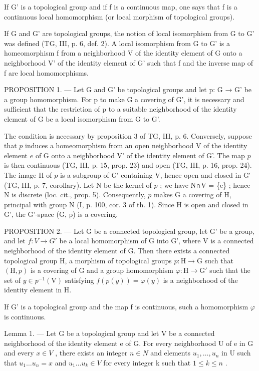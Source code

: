 If G' is a topological group and if f is a continuous map, one says that f is a continuous local homomorphism (or local morphism of topological groups).

If G and G' are topological groups, the notion of local isomorphism from G to G' was defined (TG, III, p. 6, def. 2). A local isomorphism from G to G' is a homeomorphism f from a neighborhood V of the identity element of G onto a neighborhood V' of the identity element of G' such that f and the inverse map of f are local homomorphisms.

PROPOSITION 1. --- Let G and G' be topological groups and let p: G → G' be a group homomorphism. For p to make G a covering of G', it is necessary and sufficient that the restriction of p to a suitable neighborhood of the identity element of G be a local isomorphism from G to G'.

The condition is necessary by proposition 3 of TG, III, p. 6. Conversely, suppose that \(p\) induces a homeomorphism from an open neighborhood V of the identity element \(e\) of G onto a neighborhood V' of the identity element of G'. The map \(p\) is then continuous (TG, III, p. 15, prop. 23) and open (TG, III, p. 16, prop. 24). The image H of \(p\) is a subgroup of G′ containing V, hence open and closed in G′ (TG, III, p. 7, corollary). Let N be the kernel of \(p\) ; we have N∩V = \{e\} ; hence N is discrete (loc. cit., prop. 5). Consequently, \(p\) makes G a covering of H, principal with group N (I, p. 100, cor. 3 of th. 1). Since H is open and closed in G', the G'-space (G, p) is a covering.

PROPOSITION 2. --- Let G be a connected topological group, let G' be a group, and let \(f: V \to G'\) be a local homomorphism of G into G', where V is a connected neighborhood of the identity element of G. Then there exists a connected topological group H, a morphism of topological groups \(p\colon\mathrm{H}\to\mathrm{G}\) such that \((\mathrm{H},p)\) is a covering of G and a group homomorphism \(\varphi\colon\mathrm{H}\to\mathrm{G}'\) such that the set of \(y\in p^{-1}(\mathrm{V})\) satisfying \(f(p(y))=\varphi(y)\) is a neighborhood of the identity element in H.

If G' is a topological group and the map f is continuous, such a homomorphism \(\varphi\) is continuous.

Lemma 1. — Let G be a topological group and let V be a connected neighborhood of the identity element e of G. For every neighborhood U of e in G and every \(x \in V\) , there exists an integer \(n \in N\) and elements \(u_{1}, \ldots, u_{n}\) in U such that \(u_{1} \ldots u_{n} = x\) and \(u_{1} \ldots u_{k} \in V\) for every integer k such that \(1 \leqslant k \leqslant n\) .

